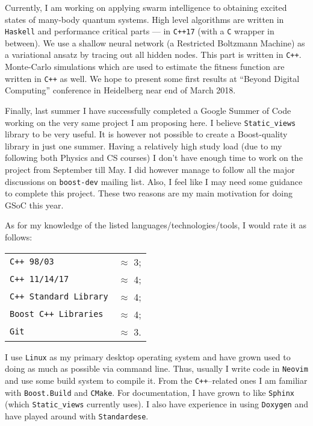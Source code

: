 \documentclass[a4paper,12pt]{article}
\begin{document}
    Currently, I am working on applying swarm intelligence to obtaining excited
    states of many-body quantum systems\cite{tcm-swarm}. High level algorithms
    are written in \texttt{Haskell} and performance critical parts --- in
    \texttt{C++17} (with a \texttt{C} wrapper in between). We use a shallow
    neural network (a Restricted Boltzmann Machine) as a variational ansatz by
    tracing out all hidden nodes. This part is written in \texttt{C++}.
    Monte-Carlo simulations which are used to estimate the fitness function are
    written in \texttt{C++} as well. We hope to present some first results at
    ``Beyond Digital Computing'' conference in Heidelberg near end of March
    2018.

    Finally, last summer I have successfully completed a Google Summer of Code
    working on the very same project I am proposing here. I believe
    \texttt{Static\_views} library to be very useful. It is however not possible
    to create a Boost-quality library in just one summer. Having a relatively
    high study load (due to my following both Physics and CS courses) I don't
    have enough time to work on the project from September till May. I did
    however manage to follow all the major discussions on \texttt{boost-dev}
    mailing list. Also, I feel like I may need some guidance to complete this
    project. These two reasons are my main motivation for doing GSoC this year.

    As for my knowledge of the listed languages/technologies/tools, I would rate
    it as follows:

    \begin{tabular}{l r}
        \texttt{C++ 98/03} & $\approx$ 3; \\
        \texttt{C++ 11/14/17} & $\approx$ 4; \\
        \texttt{C++ Standard Library} & $\approx$ 4; \\
        \texttt{Boost C++ Libraries} & $\approx$ 4; \\
        \texttt{Git} & $\approx$ 3.
    \end{tabular}

    I use \texttt{Linux} as my primary desktop operating system and have grown
    used to doing as much as possible via command line. Thus, usually I write
    code in \texttt{Neovim} and use some build system to compile it. From the
    \texttt{C++}--related ones I am familiar with \texttt{Boost.Build} and
    \texttt{CMake}. For documentation, I have grown to like \texttt{Sphinx}
    (which \texttt{Static\_views} currently uses). I also have experience in
    using \texttt{Doxygen} and have played around with \texttt{Standardese}.
\end{document}
